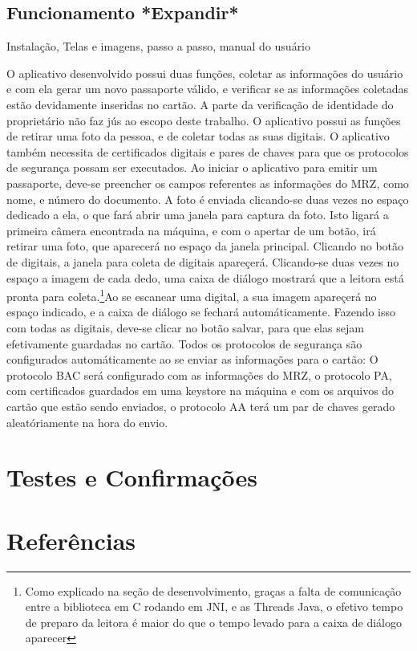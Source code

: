 \documentclass{article}
\begin{document}
	\subsection{Funcionamento *Expandir*} Instalação, Telas e imagens, passo a passo, manual do usuário
		\begin{justify}
			\hspace{2cm} O aplicativo desenvolvido possui duas funções, coletar as informações do usuário e com ela gerar um novo passaporte válido, e verificar se as informações coletadas estão devidamente inseridas no cartão. A parte da verificação de identidade do proprietário não faz jús ao escopo deste trabalho. O aplicativo possui as funções de retirar uma foto da pessoa, e de coletar todas as suas digitais. O aplicativo também necessita de certificados digitais e pares de chaves para que os protocolos de segurança possam ser executados.
			\hspace*{2cm} Ao iniciar o aplicativo para emitir um passaporte, deve-se preencher os campos referentes as informações do MRZ, como nome, e número do documento. A foto é enviada clicando-se duas vezes no espaço dedicado a ela, o que fará abrir uma janela para captura da foto. Isto ligará a primeira câmera encontrada na máquina, e com o apertar de um botão, irá retirar uma foto, que aparecerá no espaço da janela principal. Clicando no botão de digitais, a janela para coleta de digitais apareçerá. Clicando-se duas vezes no espaço a imagem de cada dedo, uma caixa de diálogo mostrará que a leitora está pronta para coleta.\footnote{Como explicado na seção de desenvolvimento, graças a falta de comunicação entre a biblioteca em C rodando em JNI, e as Threads Java, o efetivo tempo de preparo da leitora é maior do que o tempo levado para a caixa de diálogo aparecer}Ao se escanear uma digital, a sua imagem apareçerá no espaço indicado, e a caixa de diálogo se fechará automáticamente. Fazendo isso com todas as digitais, deve-se clicar no botão salvar, para que elas sejam efetivamente guardadas no cartão.
			\hspace*{2cm} Todos os protocolos de segurança são configurados automáticamente ao se enviar as informações para o cartão: O protocolo BAC será configurado com as informações do MRZ, o protocolo PA, com certificados guardados em uma keystore na máquina e com os arquivos do cartão que estão sendo enviados, o protocolo AA terá um par de chaves gerado aleatóriamente na hora do envio.
			
		\end{justify}

	\section{Testes e Confirmações}
		\begin{justify}
			
			
		\end{justify}

\begingroup
	\section{Referências}
		\renewcommand{\section}[2]{}
		
		\printbibliography		
		
\endgroup
\end{document}

